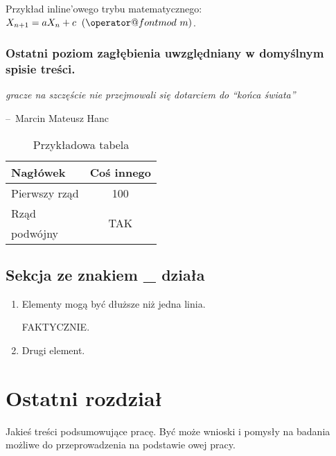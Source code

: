 \documentclass[12pt,a4paper,leqno,oneside,titlepage]{book}
\makeatletter
\def\imod#1{\allowbreak\mkern10mu({\operator@font mod}\,\,#1)}
\newenvironment{chapquote}[2][2em]
  {\setlength{\@tempdima}{#1}%
   \def\chapquote@author{#2}%
   \parshape 1 \@tempdima \dimexpr\textwidth-2\@tempdima\relax%
   \itshape}
  {\par\normalfont\hfill--\ \chapquote@author\hspace*{\@tempdima}\par\bigskip}
\makeatother
\begin{document}
Przykład inline'owego trybu matematycznego: $X_{n+1} = a X_n + c \imod{m}$.

\subsection{Ostatni poziom zagłębienia uwzględniany w domyślnym spisie treści.}

\begin{chapquote}{Marcin Mateusz Hanc}
gracze na szczęście nie przejmowali się dotarciem do ``końca świata'' \cite{Hanc15szumy}
\end{chapquote}

\begin{table}[h]
\centering
\label{tab:RNG_examples}
\begin{tabular}{l|c}
 Nagłówek & Coś innego \\
 \hline \hline
 Pierwszy rząd & 100 \\
 \hline
 Rząd & \multirow{2}{*}{TAK} \\
 podwójny & \\
\end{tabular}
\caption{Przykładowa tabela}
\end{table}



\section{Sekcja ze znakiem \_ działa}

\begin{enumerate}
\item Elementy mogą być dłuższe niż jedna linia.

FAKTYCZNIE.

\item Drugi element.

\end{enumerate}

\chapter{Ostatni rozdział}

Jakieś treści podsumowujące pracę. Być może wnioski i pomysły na badania możliwe do przeprowadzenia na podstawie owej pracy.
\end{document}
